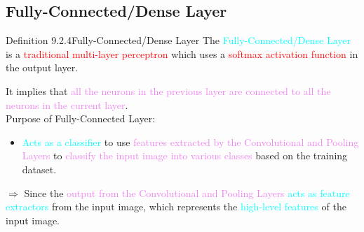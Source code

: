 \documentclass{book}
\begin{document}
\subsection{Fully-Connected/Dense Layer}
\begin{defBox}{Definition 9.2.4}{Fully-Connected/Dense Layer}
    The \textcolor{cyan}{Fully-Connected/Dense Layer} is a \textcolor{red}{traditional multi-layer perceptron} which uses a \textcolor{red}{softmax activation function} in the output layer.
\end{defBox}
It implies that \textcolor{violet}{all the neurons in the previous layer are connected to all the neurons in the current layer}.\\
Purpose of Fully-Connected Layer:\\
\begin{itemize}
    \item \textcolor{cyan}{Acts as a classifier} to use \textcolor{violet}{features extracted by the Convolutional and Pooling Layers} to \textcolor{violet}{classify the input image into various classes} based on the training dataset.
\end{itemize}
$\Rightarrow$ Since the \textcolor{violet}{output from the Convolutional and Pooling Layers} \textcolor{cyan}{acts as feature extractors} from the input image, which represents the \textcolor{cyan}{high-level features} of the input image.\\
\end{document}
